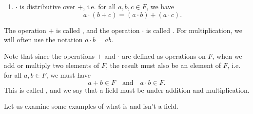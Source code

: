 \begin{defn}
\begin{enumerate}
    \item $ \cdot $ is distributive over $ + $, i.e. for all $ a,b,c\in F $, we have
    \begin{equation*}
        a\cdot(b+c)=(a\cdot b)+(a\cdot c).
    \end{equation*}
\end{enumerate}

The operation $ + $ is called , and the operation $ \cdot $ is called . For multiplication, we will often use the notation $ a\cdot b=ab $.
\end{defn}

Note that since the operations $ + $ and $ \cdot $ are defined as operations on $ F $, when we add or multiply two elements of $ F $, the result must also be an element of $ F $, i.e. for all $ a,b\in F $, we must have
\begin{equation*}
a+b\in F \quad\text{and}\quad a\cdot b\in F.
\end{equation*}
This is called , and we say that a field must be  under addition and multiplication.

Let us examine some examples of what is and isn't a field.

